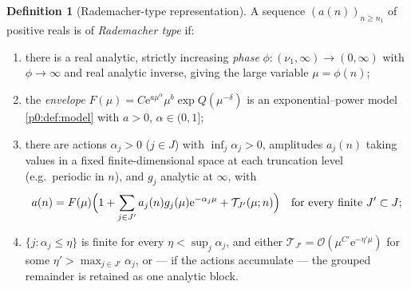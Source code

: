 \documentclass[11pt,a4paper,oneside]{book}
\theoremstyle{plain}
\theoremstyle{definition}
\newtheorem{definition}[theorem]{Definition}
\theoremstyle{remark}
\newcommand{\e}{\mathrm{e}}
\newcommand{\bigO}{\mathcal{O}}
\begin{document}
\begin{definition}[Rademacher-type representation]\label{p3:def:rademacher-type}
A sequence $(a(n))_{n\ge n_{1}}$ of positive reals is of \emph{Rademacher type} if:
\begin{enumerate}
\item[(T1)] there is a real analytic, strictly increasing \emph{phase}
$\phi:(\nu_{1},\infty)\to(0,\infty)$ with $\phi\to\infty$ and real analytic inverse, giving the
large variable $\mu=\phi(n)$;
\item[(T2)] the \emph{envelope} $F(\mu)=C\e^{a\mu^{\alpha}}\mu^{b}\exp Q(\mu^{-\delta})$
is an exponential--power model \cref{p0:def:model} with $a>0$, $\alpha\in(0,1]$;
\item[(T3)] there are actions $\alpha_{j}>0$ ($j\in J$) with $\inf_{j}\alpha_{j}>0$,
amplitudes $a_{j}(n)$ taking values in a fixed finite-dimensional space at each truncation level
(e.g.\ periodic in $n$), and $g_{j}$ analytic at $\infty$, with
      \begin{equation}\label{p3:eq:template}
       a(n)=F(\mu)\Bigl(1+\sum_{j\in J'}a_{j}(n)g_{j}(\mu)\e^{-\alpha_{j}\mu}
       +\mathcal{T}_{J'}(\mu;n)\Bigr)\quad\text{for every finite }J'\subset J;
      \end{equation}
\item[(T4)] $\{j:\alpha_{j}\le\eta\}$ is finite for every $\eta<\sup_{j}\alpha_{j}$, and
either $\mathcal{T}_{J'}=\bigO(\mu^{C'}\e^{-\eta'\mu})$ for some $\eta'>\max_{j\in
J'}\alpha_{j}$, or --- if the actions accumulate --- the grouped remainder is retained as one
analytic block.
\end{enumerate}
\end{definition}
\end{document}
